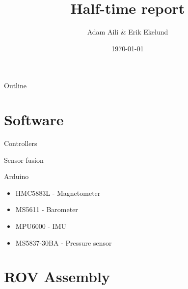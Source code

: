 \documentclass[11pt]{beamer}
\author{Adam Aili \& Erik Ekelund}
\title{Half-time report}
\date{\today}
\begin{document}
\begin{frame}
\titlepage
\end{frame}

\begin{frame}{Outline}
\tableofcontents
\end{frame}

\section{Software}
\begin{frame}{Controllers}


\end{frame}

\begin{frame}{Sensor fusion}


\end{frame}

\begin{frame}{Arduino}
\begin{itemize}
\item HMC5883L - Magnetometer
\item MS5611 - Barometer
\item MPU6000 - IMU
\item MS5837-30BA - Pressure sensor
\end{itemize}
\end{frame}

\section{ROV Assembly}
\begin{frame}{}

\end{frame}
\end{document}
